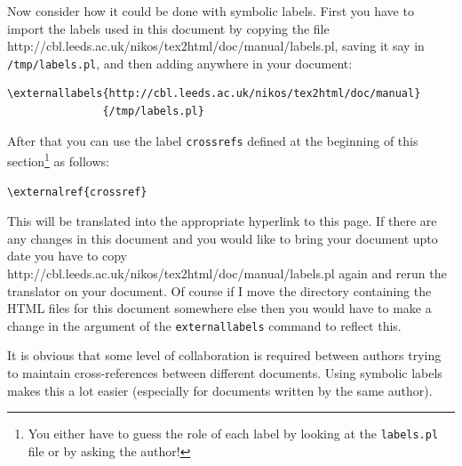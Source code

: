 \documentclass[dvips]{article}
\begin{document}
Now consider how it could be done with symbolic labels. 
First you have to import the labels used in this document 
by copying the file 
{http://cbl.leeds.ac.uk/nikos/tex2html/doc/manual/labels.pl},
saving it say
in \texttt{/tmp/labels.pl},
and then adding anywhere in your document:
\begin{verbatim}
\externallabels{http://cbl.leeds.ac.uk/nikos/tex2html/doc/manual}
               {/tmp/labels.pl}
\end{verbatim}
After that you can use the label \texttt{crossrefs} defined at the beginning of this 
section\footnote{You either have to guess the role of each label by
looking at the \texttt{labels.pl} file or by asking the author!} as follows:
\begin{verbatim}
\externalref{crossref}
\end{verbatim}
This will be translated into the appropriate hyperlink to this page.
If there are any changes in this document and you would like to
bring your document upto date you have to copy 
{http://cbl.leeds.ac.uk/nikos/tex2html/doc/manual/labels.pl} again
and rerun the translator on your document. Of course if I move the 
directory containing the HTML files for this document somewhere else 
then you would have to make a change in the argument of the 
\texttt{externallabels} command to reflect this. 

It is obvious that some level of collaboration is required between
authors trying to maintain cross-references between different documents. 
Using symbolic labels makes this a lot easier (especially for documents
written by the same author).
\end{document}

